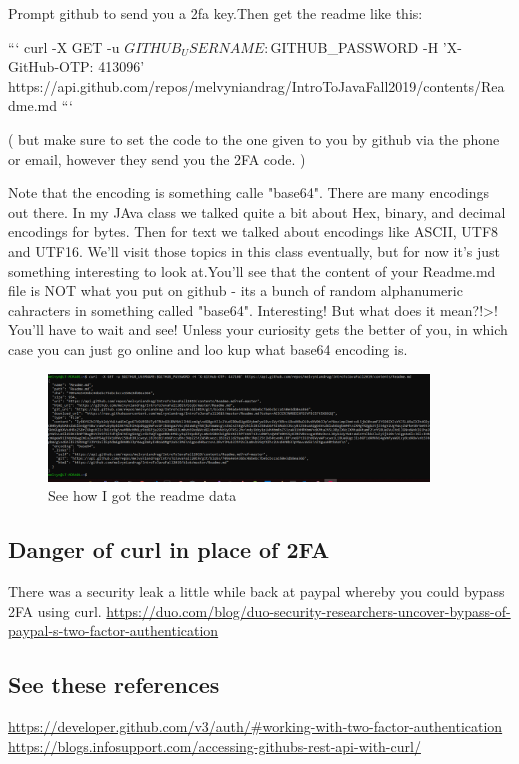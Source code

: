 \documentclass[10pt]{article}
\begin{document}
Prompt github to send you a 2fa key.Then get the readme like this:

```
curl  -X GET -u $GITHUB_USERNAME:$GITHUB_PASSWORD -H 'X-GitHub-OTP: 413096' https://api.github.com/repos/melvyniandrag/IntroToJavaFall2019/contents/Readme.md
```

( but make sure to set the code to the one given to you by github via the phone or email, however they send you the 2FA code. )

Note that the encoding is something calle "base64".  There are many encodings out there. In my JAva class we talked quite a bit about Hex, binary, and decimal encodings for bytes. Then for text we talked about encodings like ASCII, UTF8 and UTF16. We'll visit those topics in this class eventually, but for now it's just something interesting to look at.You'll see that the content of your Readme.md file is NOT what you put on github - its a bunch of random alphanumeric cahracters in something called "base64". Interesting! But what does it mean?!>! You'll have to wait and see! Unless your curiosity gets the better of you, in which case you can just go online and loo kup what base64 encoding is.

\begin{figure}[h]
  \centering
    \includegraphics[width=0.9\textwidth]{getReadme.PNG}
  \caption{See how I got the readme data}
\end{figure}

\subsection{Danger of curl in place of 2FA}
There was a security leak a little while back at paypal whereby you could bypass 2FA using curl.
\url{https://duo.com/blog/duo-security-researchers-uncover-bypass-of-paypal-s-two-factor-authentication}

\subsection{See these references}
\url{https://developer.github.com/v3/auth/#working-with-two-factor-authentication}
\url{https://blogs.infosupport.com/accessing-githubs-rest-api-with-curl/}
\end{document}
